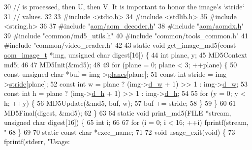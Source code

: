 \begin{DoxyCodeInclude}
30 \textcolor{comment}{// is processed, then U, then V. It is important to honor the image's `stride`}
31 \textcolor{comment}{// values.}
32 
33 \textcolor{preprocessor}{#include <stdio.h>}
34 \textcolor{preprocessor}{#include <stdlib.h>}
35 \textcolor{preprocessor}{#include <string.h>}
36 
37 \textcolor{preprocessor}{#include "\hyperlink{aom__decoder_8h}{aom/aom\_decoder.h}"}
38 \textcolor{preprocessor}{#include "\hyperlink{aomdx_8h}{aom/aomdx.h}"}
39 \textcolor{preprocessor}{#include "common/md5\_utils.h"}
40 \textcolor{preprocessor}{#include "common/tools\_common.h"}
41 \textcolor{preprocessor}{#include "common/video\_reader.h"}
42 
43 \textcolor{keyword}{static} \textcolor{keywordtype}{void} get\_image\_md5(\textcolor{keyword}{const} \hyperlink{structaom__image}{aom\_image\_t} *img, \textcolor{keywordtype}{unsigned} \textcolor{keywordtype}{char} digest[16]) \{
44   \textcolor{keywordtype}{int} plane, y;
45   MD5Context md5;
46 
47   MD5Init(&md5);
48 
49   \textcolor{keywordflow}{for} (plane = 0; plane < 3; ++plane) \{
50     \textcolor{keyword}{const} \textcolor{keywordtype}{unsigned} \textcolor{keywordtype}{char} *buf = img->\hyperlink{structaom__image_ac54dbc5237ca2914f9ec30105dfbe302}{planes}[plane];
51     \textcolor{keyword}{const} \textcolor{keywordtype}{int} stride = img->\hyperlink{structaom__image_a6dc693d7dbc9eb06c0cdde307ca58372}{stride}[plane];
52     \textcolor{keyword}{const} \textcolor{keywordtype}{int} w = plane ? (img->\hyperlink{structaom__image_a89f80b1f58d608b9d2080635f4359034}{d\_w} + 1) >> 1 : img->\hyperlink{structaom__image_a89f80b1f58d608b9d2080635f4359034}{d\_w};
53     \textcolor{keyword}{const} \textcolor{keywordtype}{int} h = plane ? (img->\hyperlink{structaom__image_ab986419a1f0fff93a2dc505f47194988}{d\_h} + 1) >> 1 : img->\hyperlink{structaom__image_ab986419a1f0fff93a2dc505f47194988}{d\_h};
54 
55     \textcolor{keywordflow}{for} (y = 0; y < h; ++y) \{
56       MD5Update(&md5, buf, w);
57       buf += stride;
58     \}
59   \}
60 
61   MD5Final(digest, &md5);
62 \}
63 
64 \textcolor{keyword}{static} \textcolor{keywordtype}{void} print\_md5(FILE *stream, \textcolor{keywordtype}{unsigned} \textcolor{keywordtype}{char} digest[16]) \{
65   \textcolor{keywordtype}{int} i;
66 
67   \textcolor{keywordflow}{for} (i = 0; i < 16; ++i) fprintf(stream, \textcolor{stringliteral}{"%
68 \}
69 
70 \textcolor{keyword}{static} \textcolor{keyword}{const} \textcolor{keywordtype}{char} *exec\_name;
71 
72 \textcolor{keywordtype}{void} usage\_exit(\textcolor{keywordtype}{void}) \{
73   fprintf(stderr, \textcolor{stringliteral}{"Usage: %
}}
\end{DoxyCodeInclude}
